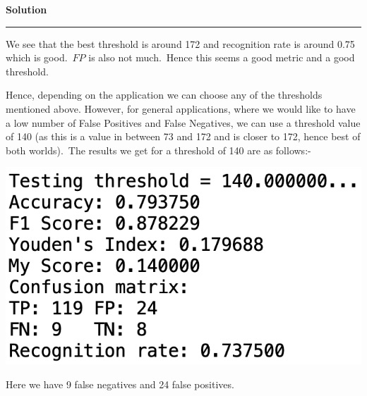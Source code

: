 \documentclass[a4paper,12pt]{article}
\newenvironment{solution}[2][]{%
    \begin{mdframed}[linecolor=blue!70!black, linewidth=2pt, roundcorner=10pt, backgroundcolor=yellow!10!white, skipabove=12pt, skipbelow=12pt]%
        \textbf{\large #2}
        \par\noindent\rule{\textwidth}{0.4pt}
}{
    \end{mdframed}
}
\begin{document}
\begin{solution}{Solution}
\begin{itemize}
\begin{center}
		\end{center}
		We see that the best threshold is around 172 and recognition rate is around 0.75 which is good.\ $FP$ is also not much.\ Hence this seems a good metric and a good threshold.
	\end{itemize}
	Hence, depending on the application we can choose any of the thresholds mentioned above. However, for general applications, where we would like to have a low number of False Positives and False Negatives, we can use a threshold value of 140 (as this is a value in between 73 and 172 and is closer to 172, hence best of both worlds).\ The results we get for a threshold of 140 are as follows:-
	\begin{center}
		\includegraphics[scale=0.5]{../images/test.png}
	\end{center}
	Here we have 9 false negatives and 24 false positives.
\end{solution}
\end{document}
